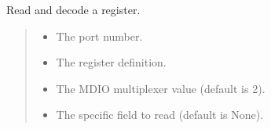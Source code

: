 \documentclass[letterpaper,10pt,english]{sphinxmanual}
\begin{document}
\begin{fulllineitems}
\label{\detokenize{cplddocs:phy_marvell_88X2222_init.read_and_decode}}
\pysigstartsignatures
{}
\pysigstopsignatures
\sphinxAtStartPar
Read and decode a register.
\begin{quote}\begin{description}
\begin{itemize}
\item {} 
\sphinxAtStartPar
{} \textendash{} The port number.

\item {} 
\sphinxAtStartPar
{} \textendash{} The register definition.

\item {} 
\sphinxAtStartPar
{} \textendash{} The MDIO multiplexer value (default is 2).

\item {} 
\sphinxAtStartPar
{} \textendash{} The specific field to read (default is None).

\end{itemize}

\end{description}\end{quote}

\end{fulllineitems}

\end{document}
